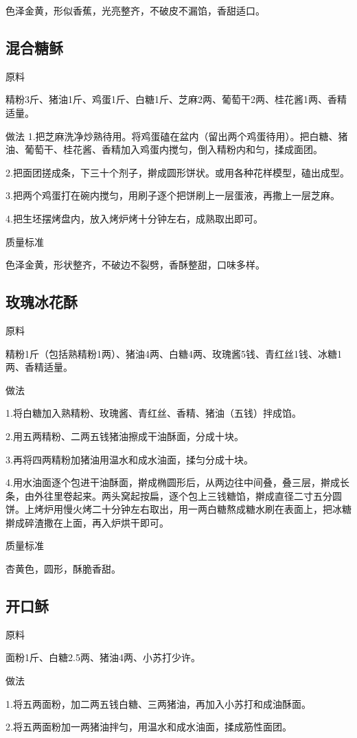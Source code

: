 \documentclass{ctexbook}
\begin{document}
色泽金黄，形似香蕉，光亮整齐，不破皮不漏馅，香甜适口。
\subsection{混合糖稣}
原料

精粉3斤、猪油1斤、鸡蛋1斤、白糖1斤、芝麻2两、葡萄干2两、桂花酱1两、香精适量。

做法
1.把芝麻洗净炒熟待用。将鸡蛋磕在盆内（留出两个鸡蛋待用）。把白糖、猪油、葡萄干、桂花酱、香精加入鸡蛋内搅匀，倒入精粉内和匀，揉成面团。

2.把面团搓成条，下三十个剂子，擀成圆形饼状。或用各种花样模型，磕出成型。

3.把两个鸡蛋打在碗内搅匀，用刷子逐个把饼刷上一层蛋液，再撒上一层芝麻。

4.把生坯摆烤盘内，放入烤炉烤十分钟左右，成熟取出即可。

质量标准

色泽金黄，形状整齐，不破边不裂劈，香酥整甜，口味多样。
\subsection{玫瑰冰花酥}
原料

精粉1斤（包括熟精粉1两）、猪油4两、白糖4两、玫瑰酱5钱、青红丝1钱、冰糖1两、香精适量。

做法

1.将白糖加入熟精粉、玫瑰酱、青红丝、香精、猪油（五钱）拌成馅。

2.用五两精粉、二两五钱猪油擦成干油酥面，分成十块。

3.再将四两精粉加猪油用温水和成水油面，揉匀分成十块。

4.用水油面逐个包进干油酥面，擀成椭圆形后，从两边往中间叠，叠三层，擀成长条，由外往里卷起来。两头窝起按扁，逐个包上三钱糖馅，擀成直径二寸五分圆饼。上烤炉用慢火烤二十分钟左右取出，用一两白糖熬成糖水刷在表面上，把冰糖擀成碎渣撒在上面，再入炉烘干即可。

质量标准

杏黄色，圆形，酥脆香甜。
\subsection{开口稣}
原料

面粉1斤、白糖2.5两、猪油4两、小苏打少许。

做法

1.将五两面粉，加二两五钱白糖、三两猪油，再加入小苏打和成油酥面。

2.将五两面粉加一两猪油拌匀，用温水和成水油面，揉成筋性面团。
\end{document}
